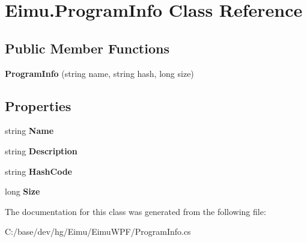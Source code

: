 \hypertarget{class_eimu_1_1_program_info}{
\section{Eimu.ProgramInfo Class Reference}
\label{class_eimu_1_1_program_info}
}
\subsection*{Public Member Functions}
\begin{DoxyCompactItemize}
\item 
\hypertarget{class_eimu_1_1_program_info_a4cf048f65bd6a6c7384412dba8fa1950}{
{\bfseries ProgramInfo} (string name, string hash, long size)}
\label{class_eimu_1_1_program_info_a4cf048f65bd6a6c7384412dba8fa1950}

\end{DoxyCompactItemize}
\subsection*{Properties}
\begin{DoxyCompactItemize}
\item 
\hypertarget{class_eimu_1_1_program_info_a3cfb22da35f783d9081ee3accb5e8b84}{
string {\bfseries Name}}
\label{class_eimu_1_1_program_info_a3cfb22da35f783d9081ee3accb5e8b84}

\item 
\hypertarget{class_eimu_1_1_program_info_a202fe6a2d0f513ccb7c399fa16fb5d72}{
string {\bfseries Description}}
\label{class_eimu_1_1_program_info_a202fe6a2d0f513ccb7c399fa16fb5d72}

\item 
\hypertarget{class_eimu_1_1_program_info_a691144a504090bead3f7e4cb6c557a4e}{
string {\bfseries HashCode}}
\label{class_eimu_1_1_program_info_a691144a504090bead3f7e4cb6c557a4e}

\item 
\hypertarget{class_eimu_1_1_program_info_a6b267e324651d9cd1afe7a37ad614d03}{
long {\bfseries Size}}
\label{class_eimu_1_1_program_info_a6b267e324651d9cd1afe7a37ad614d03}

\end{DoxyCompactItemize}


The documentation for this class was generated from the following file:\begin{DoxyCompactItemize}
\item 
C:/base/dev/hg/Eimu/EimuWPF/ProgramInfo.cs\end{DoxyCompactItemize}
